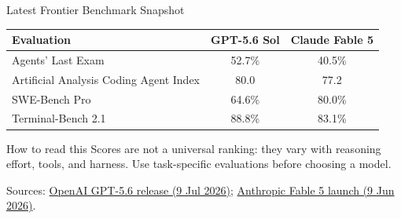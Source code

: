 \begin{frame}{Latest Frontier Benchmark Snapshot}
  \small
  \centering
  \begin{tabular}{lcc}
    \toprule
    \textbf{Evaluation} & \textbf{GPT-5.6 Sol} & \textbf{Claude Fable 5} \\
    \midrule
    Agents' Last Exam & 52.7\% & 40.5\% \\
    Artificial Analysis Coding Agent Index & 80.0 & 77.2 \\
    SWE-Bench Pro & 64.6\% & 80.0\% \\
    Terminal-Bench 2.1 & 88.8\% & 83.1\% \\
    \bottomrule
  \end{tabular}
  \vspace{0.8em}
  \begin{block}{How to read this}
    Scores are not a universal ranking: they vary with reasoning effort, tools, and harness. Use task-specific evaluations before choosing a model.
  \end{block}
  \centering\tiny Sources: \href{https://openai.com/index/gpt-5-6/}{OpenAI GPT-5.6 release (9 Jul 2026)}; \href{https://www.anthropic.com/news/claude-fable-5-mythos-5}{Anthropic Fable 5 launch (9 Jun 2026)}.
\end{frame}

